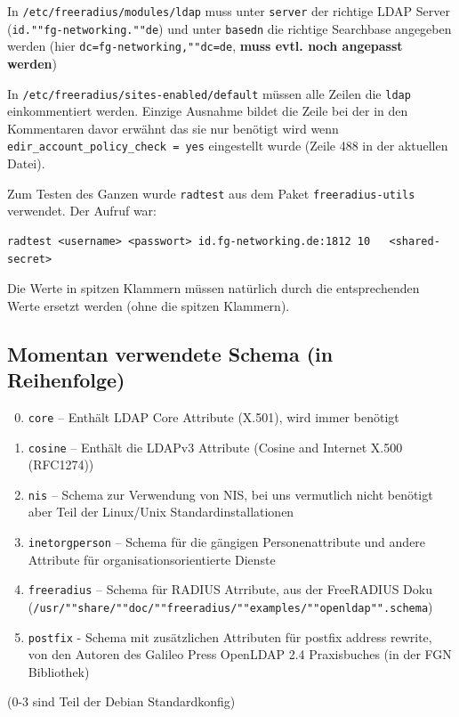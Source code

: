\documentclass[11pt,a4paper,titlepage=firstiscover,headsepline,bibtotoc]{scrartcl} %
\begin{document}
In \texttt{/etc/freeradius/modules/ldap} muss unter \texttt{server} der richtige LDAP Server (\texttt{id.""fg-networking.""de}) und unter \texttt{basedn} die richtige Searchbase angegeben werden (hier \texttt{dc=fg-networking,""dc=de}, \textbf{muss evtl. noch angepasst werden})

In \texttt{/etc/freeradius/sites-enabled/default} müssen alle Zeilen die \texttt{ldap} einkommentiert werden. Einzige Ausnahme bildet die Zeile bei der in den Kommentaren davor erwähnt das sie nur benötigt wird wenn \texttt{edir\_account\_policy\_check = yes} eingestellt wurde (Zeile 488 in der aktuellen Datei).

Zum Testen des Ganzen wurde \texttt{radtest} aus dem Paket \texttt{freeradius-utils} verwendet. Der Aufruf war:
\begin{lstlisting}
radtest <username> <passwort> id.fg-networking.de:1812 10	<shared-secret>
\end{lstlisting}
Die Werte in spitzen Klammern müssen natürlich durch die entsprechenden Werte ersetzt werden (ohne die spitzen Klammern).


\subsection{Momentan verwendete Schema (in Reihenfolge)}
\begin{enumerate}
\setcounter{enumi}{-1}
\item \texttt{core} -- Enthält LDAP Core Attribute (X.501), wird immer benötigt
\item \texttt{cosine} -- Enthält die LDAPv3 Attribute (Cosine and Internet X.500 (RFC1274))
\item \texttt{nis} -- Schema zur Verwendung von NIS, bei uns vermutlich nicht benötigt aber Teil der Linux/Unix Standardinstallationen
\item \texttt{inetorgperson} -- Schema für die gängigen Personenattribute und andere Attribute für organisationsorientierte Dienste
\item \texttt{freeradius} -- Schema für RADIUS Atrribute, aus der FreeRADIUS Doku (\texttt{/usr/""share/""doc/""freeradius/""examples/""openldap"".schema})
\item \texttt{postfix} - Schema mit zusätzlichen Attributen für postfix address rewrite, von den Autoren des Galileo Press OpenLDAP 2.4 Praxisbuches (in der FGN Bibliothek)
\end{enumerate}
(0-3 sind Teil der Debian Standardkonfig)
\end{document}
